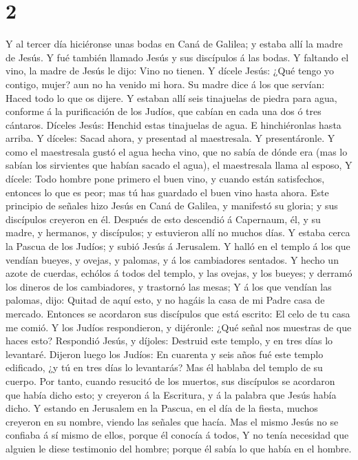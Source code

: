 \hypertarget{section-1}{%
\section{2}\label{section-1}}

 Y al tercer día hiciéronse unas bodas en Caná de Galilea; y
estaba allí la madre de Jesús.  Y fué también llamado Jesús
y sus discípulos á las bodas.  Y faltando el vino, la madre
de Jesús le dijo: Vino no tienen.  Y dícele Jesús: ¿Qué
tengo yo contigo, mujer? aun no ha venido mi hora.  Su madre
dice á los que servían: Haced todo lo que os dijere.  Y
estaban allí seis tinajuelas de piedra para agua, conforme á la
purificación de los Judíos, que cabían en cada una dos ó tres cántaros.
 Díceles Jesús: Henchid estas tinajuelas de agua. E
hinchiéronlas hasta arriba.  Y díceles: Sacad ahora, y
presentad al maestresala. Y presentáronle.  Y como el
maestresala gustó el agua hecha vino, que no sabía de dónde era (mas lo
sabían los sirvientes que habían sacado el agua), el maestresala llama
al esposo,  Y dícele: Todo hombre pone primero el buen
vino, y cuando están satisfechos, entonces lo que es peor; mas tú has
guardado el buen vino hasta ahora.  Este principio de
señales hizo Jesús en Caná de Galilea, y manifestó su gloria; y sus
discípulos creyeron en él.  Después de esto descendió á
Capernaum, él, y su madre, y hermanos, y discípulos; y estuvieron allí
no muchos días.  Y estaba cerca la Pascua de los Judíos; y
subió Jesús á Jerusalem.  Y halló en el templo á los que
vendían bueyes, y ovejas, y palomas, y á los cambiadores sentados.
 Y hecho un azote de cuerdas, echólos á todos del templo, y
las ovejas, y los bueyes; y derramó los dineros de los cambiadores, y
trastornó las mesas;  Y á los que vendían las palomas,
dijo: Quitad de aquí esto, y no hagáis la casa de mi Padre casa de
mercado.  Entonces se acordaron sus discípulos que está
escrito: El celo de tu casa me comió.  Y los Judíos
respondieron, y dijéronle: ¿Qué señal nos muestras de que haces esto?
 Respondió Jesús, y díjoles: Destruid este templo, y en
tres días lo levantaré.  Dijeron luego los Judíos: En
cuarenta y seis años fué este templo edificado, ¿y tú en tres días lo
levantarás?  Mas él hablaba del templo de su cuerpo.
 Por tanto, cuando resucitó de los muertos, sus discípulos
se acordaron que había dicho esto; y creyeron á la Escritura, y á la
palabra que Jesús había dicho.  Y estando en Jerusalem en
la Pascua, en el día de la fiesta, muchos creyeron en su nombre, viendo
las señales que hacía.  Mas el mismo Jesús no se confiaba á
sí mismo de ellos, porque él conocía á todos,  Y no tenía
necesidad que alguien le diese testimonio del hombre; porque él sabía lo
que había en el hombre.

